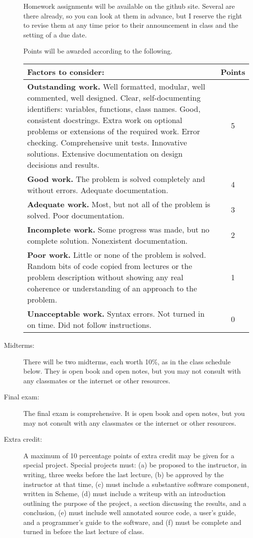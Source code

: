 \documentclass{article}
\begin{document}
\begin{description}
Homework assignments will be available on the github site.
Several are there already, so you can look at them in advance,
but I reserve the right to revise them at any time prior to
their announcement in class and the setting of a due date.

Points will be awarded according to the
following.


\begin{tabular}{p{}|c}
\bf Factors to consider: & \bf Points \\\hline
{\bf Outstanding work.}    Well formatted, modular,
well commented, well designed.  
Clear, self-documenting identifiers: variables, functions, class names.
Good, consistent docstrings.
 Extra work on optional problems or extensions
of the required work.  Error checking.  Comprehensive unit tests. Innovative solutions.
Extensive documentation on design decisions and results.
 & 5 \\\hline
{\bf Good work.}  The problem is solved completely and without errors.
Adequate documentation.
 & 4 \\\hline
{\bf Adequate work.}  Most, but not all of the problem is solved.  Poor documentation.
 & 3 \\\hline
 {\bf Incomplete work.}  Some progress was made, but no complete solution.
 Nonexistent documentation.
 & 2 \\\hline
{\bf Poor work.}  Little or none of the problem is solved.  Random bits of code copied
from lectures or the problem description without showing any real coherence
or understanding of an approach to the problem.
 & 1 \\\hline
{\bf Unacceptable work.}
 Syntax errors.  Not turned in on time.  Did not follow instructions. & 0 \\
\end{tabular}
\item[Midterms:]  There will be two midterms, each worth 10\%, as
in the class schedule below.   They is open
book and open notes, but you may not consult with any classmates
or the internet or other resources.


\item[Final exam:]  The final exam is comprehensive.  It is open
book and open notes, but you may not consult with any classmates
or the internet or other resources.



\item[Extra credit:] A maximum of 10 percentage points of extra
credit may be given for a special project.  Special projects must: (a)
be proposed to the instructor, in writing, three weeks before the last
lecture, (b) be approved by the instructor at that time, (c) must
include a substantive software component, written in Scheme, (d) must
include a writeup with an introduction outlining the purpose of the
project, a section discussing the results, and a conclusion,
(e) must include well annotated source code, a user's guide, and a
programmer's guide to the software, and (f) must be complete and
turned in before the last lecture of class.


\end{description}
\end{document}
